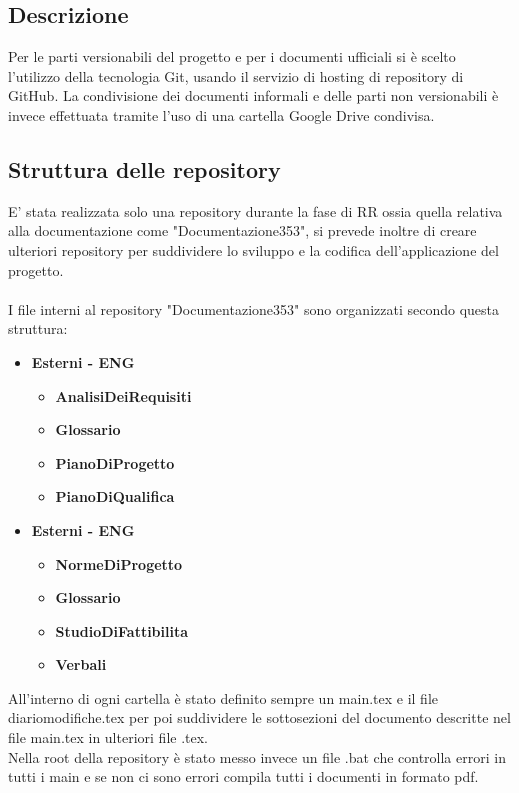 \documentclass[NormeDiProgetto.tex]{subfiles}
\begin{document}
	\subsection{Descrizione}
	Per le parti versionabili del progetto e per i documenti ufficiali si è scelto l'utilizzo della tecnologia Git, usando il servizio di hosting di repository di GitHub.
	La condivisione dei documenti informali e delle parti non versionabili è invece effettuata tramite l'uso di una cartella Google Drive condivisa.
	
	\subsection{Struttura delle repository}
	E' stata realizzata solo una repository durante la fase di RR ossia quella relativa alla documentazione come "Documentazione353", si prevede inoltre di creare ulteriori repository per suddividere lo sviluppo e la codifica dell'applicazione del progetto. \\\\
	I file interni al repository "Documentazione353" sono organizzati secondo questa struttura:
	\begin{itemize}
		\item \textbf{Esterni - ENG}
				\begin{itemize}
				\item \textbf{AnalisiDeiRequisiti}
				\item \textbf{Glossario}
				\item \textbf{PianoDiProgetto}
				\item \textbf{PianoDiQualifica}
			\end{itemize}
		\item \textbf{Esterni - ENG}
				\begin{itemize}
					\item \textbf{NormeDiProgetto}
					\item \textbf{Glossario}
					\item \textbf{StudioDiFattibilita}
					\item \textbf{Verbali}
				\end{itemize}		
	\end{itemize}	
	All'interno di ogni cartella è stato definito sempre un main.tex e il file diariomodifiche.tex per poi suddividere le sottosezioni del documento descritte nel file main.tex in ulteriori file .tex.\\
	Nella root della repository è stato messo invece un file .bat che controlla errori in tutti i main e se non ci sono errori compila tutti i documenti in formato pdf.
	
\end{document}
